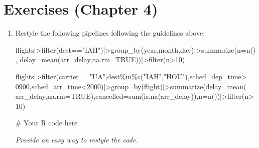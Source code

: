 \documentclass[
  letterpaper,
  DIV=11,
  numbers=noendperiod]{scrreprt}
\newenvironment{Shaded}{\begin{snugshade}}{\end{snugshade}}
\newcommand{\AttributeTok}[1]{\textcolor[rgb]{0.40,0.45,0.13}{#1}}
\newcommand{\CommentTok}[1]{\textcolor[rgb]{0.37,0.37,0.37}{#1}}
\newcommand{\ConstantTok}[1]{\textcolor[rgb]{0.56,0.35,0.01}{#1}}
\newcommand{\DecValTok}[1]{\textcolor[rgb]{0.68,0.00,0.00}{#1}}
\newcommand{\FunctionTok}[1]{\textcolor[rgb]{0.28,0.35,0.67}{#1}}
\newcommand{\NormalTok}[1]{\textcolor[rgb]{0.00,0.23,0.31}{#1}}
\newcommand{\SpecialCharTok}[1]{\textcolor[rgb]{0.37,0.37,0.37}{#1}}
\newcommand{\StringTok}[1]{\textcolor[rgb]{0.13,0.47,0.30}{#1}}
\begin{document}
\hypertarget{exercises-chapter-4}{%
\chapter{Exercises (Chapter 4)}\label{exercises-chapter-4}}

\begin{enumerate}
\def\labelenumi{\arabic{enumi}.}
\item
  Restyle the following pipelines following the guidelines above.

\begin{Shaded}
\begin{Highlighting}[]
\NormalTok{flights}\SpecialCharTok{|\textgreater{}}\FunctionTok{filter}\NormalTok{(dest}\SpecialCharTok{==}\StringTok{"IAH"}\NormalTok{)}\SpecialCharTok{|\textgreater{}}\FunctionTok{group\_by}\NormalTok{(year,month,day)}\SpecialCharTok{|\textgreater{}}\FunctionTok{summarize}\NormalTok{(}\AttributeTok{n=}\FunctionTok{n}\NormalTok{(),}
\AttributeTok{delay=}\FunctionTok{mean}\NormalTok{(arr\_delay,}\AttributeTok{na.rm=}\ConstantTok{TRUE}\NormalTok{))}\SpecialCharTok{|\textgreater{}}\FunctionTok{filter}\NormalTok{(n}\SpecialCharTok{\textgreater{}}\DecValTok{10}\NormalTok{)}

\NormalTok{flights}\SpecialCharTok{|\textgreater{}}\FunctionTok{filter}\NormalTok{(carrier}\SpecialCharTok{==}\StringTok{"UA"}\NormalTok{,dest}\SpecialCharTok{\%in\%}\FunctionTok{c}\NormalTok{(}\StringTok{"IAH"}\NormalTok{,}\StringTok{"HOU"}\NormalTok{),sched\_dep\_time}\SpecialCharTok{\textgreater{}}
\DecValTok{0900}\NormalTok{,sched\_arr\_time}\SpecialCharTok{\textless{}}\DecValTok{2000}\NormalTok{)}\SpecialCharTok{|\textgreater{}}\FunctionTok{group\_by}\NormalTok{(flight)}\SpecialCharTok{|\textgreater{}}\FunctionTok{summarize}\NormalTok{(}\AttributeTok{delay=}\FunctionTok{mean}\NormalTok{(}
\NormalTok{arr\_delay,}\AttributeTok{na.rm=}\ConstantTok{TRUE}\NormalTok{),}\AttributeTok{cancelled=}\FunctionTok{sum}\NormalTok{(}\FunctionTok{is.na}\NormalTok{(arr\_delay)),}\AttributeTok{n=}\FunctionTok{n}\NormalTok{())}\SpecialCharTok{|\textgreater{}}\FunctionTok{filter}\NormalTok{(n}\SpecialCharTok{\textgreater{}}\DecValTok{10}\NormalTok{)}
\end{Highlighting}
\end{Shaded}

  \begin{tcolorbox}[enhanced jigsaw, left=2mm, rightrule=.15mm, bottomtitle=1mm, opacitybacktitle=0.6, leftrule=.75mm, opacityback=0, colframe=quarto-callout-note-color-frame, bottomrule=.15mm, coltitle=black, toptitle=1mm, colback=white, titlerule=0mm, colbacktitle=quarto-callout-note-color!10!white, title={Answer}, toprule=.15mm, breakable, arc=.35mm]

\begin{Shaded}
\begin{Highlighting}[]
\CommentTok{\# Your R code here}
\end{Highlighting}
\end{Shaded}

  \emph{Provide an easy way to restyle the code.}

  \end{tcolorbox}
\end{enumerate}
\end{document}
